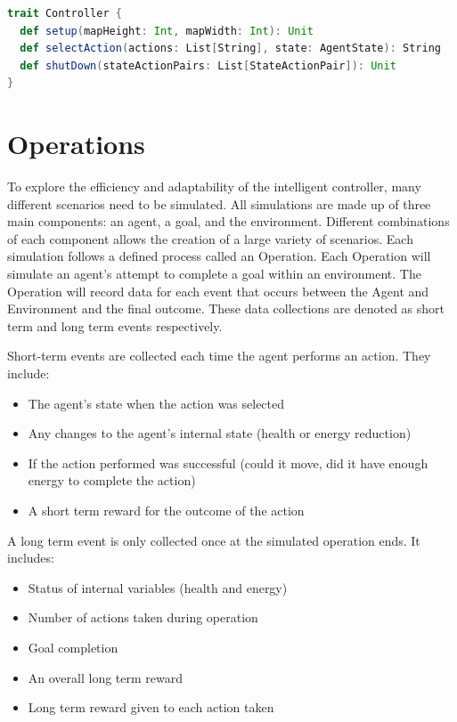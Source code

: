\begin{lstlisting}[language=Scala]
trait Controller {
  def setup(mapHeight: Int, mapWidth: Int): Unit
  def selectAction(actions: List[String], state: AgentState): String
  def shutDown(stateActionPairs: List[StateActionPair]): Unit
}
\end{lstlisting}



\section{Operations} \label{sec:operations}
To explore the efficiency and adaptability of the intelligent controller, many different scenarios need to be simulated.
All simulations are made up of three main components: an agent, a goal, and the environment.
Different combinations of each component allows the creation of a large variety of scenarios.
Each simulation follows a defined process called an Operation. 
Each Operation will simulate an agent's attempt to complete a goal within an environment.
The Operation will record data for each event that occurs between the Agent and Environment and the final outcome.
These data collections are denoted as short term and long term events respectively.

\noindent
Short-term events are collected each time the agent performs an action.
They include:

\begin{itemize}
  \item The agent's state when the action was selected
  \item Any changes to the agent's internal state (health or energy reduction)
  \item If the action performed was successful (could it move, did it have enough energy to complete the action)
  \item A short term reward for the outcome of the action
\end{itemize}

\noindent
A long term event is only collected once at the simulated operation ends.
It includes:

\begin{itemize}
  \item Status of internal variables (health and energy)
  \item Number of actions taken during operation
  \item Goal completion
  \item An overall long term reward
  \item Long term reward given to each action taken
\end{itemize}


